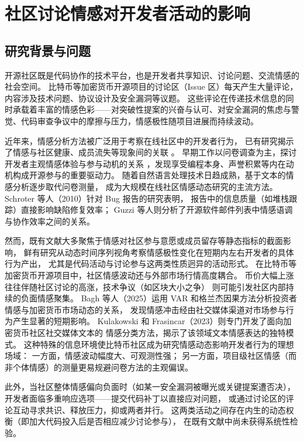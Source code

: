 \chapter{社区讨论情感对开发者活动的影响}

\section{研究背景与问题}

开源社区既是代码协作的技术平台，也是开发者共享知识、讨论问题、交流情感的社会空间。
比特币等加密货币开源项目的讨论区（Issue 区）每天产生大量评论，内容涉及技术问题、协议设计及安全漏洞等议题。
这些评论在传递技术信息的同时承载着丰富的情感色彩——对突破性提案的兴奋与认可、对安全漏洞的焦虑与警觉、代码审查争议中的摩擦与压力，情感极性随项目进展而持续波动。

近年来，情感分析方法被广泛用于考察在线社区中的开发者行为，
已有研究揭示了情感与社区健康、成员流失等现象间的关联
\cite{yang2021differential,fang2009understanding}。
早期工作以问卷调查为主，探讨开发者主观情感体验与参与动机的关系
\cite{shah2006motivation}，发现享受编程本身、声誉积累等内在动机构成开源参与的重要驱动力。
随着自然语言处理技术日趋成熟，基于文本的情感分析逐步取代问卷测量，
成为大规模在线社区情感动态研究的主流方法\cite{guzzi2013}。
Schroter 等人（2010）针对 Bug 报告的研究表明，
报告中的信息质量（如堆栈跟踪）直接影响缺陷修复效率\cite{schroter2010}；
Guzzi 等人则分析了开源软件邮件列表中情感语调与协作效率之间的关系\cite{guzzi2013}。

然而，既有文献大多聚焦于情感对社区参与意愿或成员留存等静态指标的截面影响，
鲜有研究从动态时间序列视角考察情感极性变化在短期内左右开发者的具体行为产出，
尤其是代码活动与讨论参与这两类性质迥异的活动形式。
在比特币等加密货币开源项目中，社区情感波动还与外部市场行情高度耦合。
币价大幅上涨往往伴随社区讨论的高涨，技术争议（如区块大小之争）
则可能引发社区内部持续的负面情感聚集\cite{kobayakawa2020impact}。
Bagh 等人（2025）运用 VAR 和格兰杰因果方法分析投资者情感与加密货币市场动态的关系，
发现情感冲击经由社交媒体渠道对市场参与行为产生显著的短期影响\cite{bagh2025investor}。
Kulakowski 和 Frasincar（2023）则专门开发了面向加密货币社区社交媒体文本的
情感分类方法，揭示了该领域文本情感表达的独特模式\cite{kulakowski2023sentiment}。
这种特殊的信息环境使比特币社区成为研究情感动态影响开发者行为的理想场域：
一方面，情感波动幅度大、可观测性强；
另一方面，项目级社区情感（而非个体情感）的测量更易规避问卷方法的主观偏误。

此外，当社区整体情感偏向负面时（如某一安全漏洞被曝光或关键提案遭否决），
开发者面临多重响应选项——提交代码补丁以直接应对问题，
或通过讨论区的评论互动寻求共识、释放压力，抑或两者并行。
这两类活动之间存在内生的动态权衡（即加大代码投入后是否相应减少讨论参与），
在既有文献中尚未获得系统性检验。

